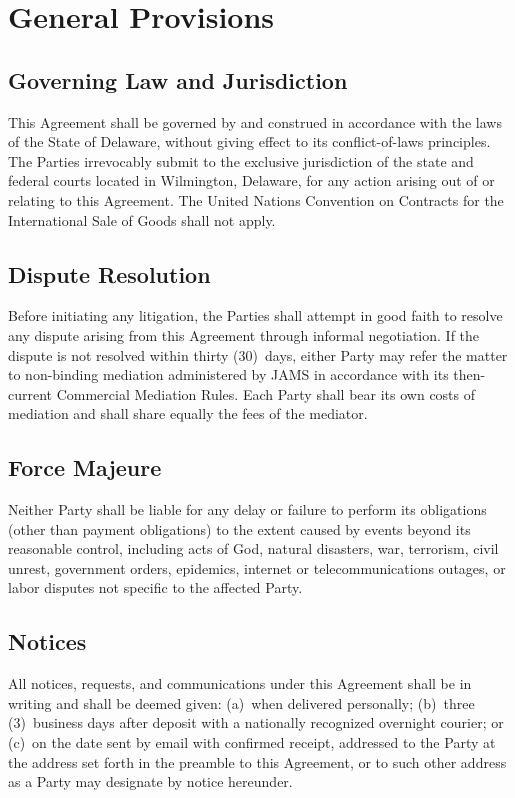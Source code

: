 \section{General Provisions}

\subsection{Governing Law and Jurisdiction}
This Agreement shall be governed by and construed in accordance with the laws of the State of Delaware, without giving effect to its conflict-of-laws principles. The Parties irrevocably submit to the exclusive jurisdiction of the state and federal courts located in Wilmington, Delaware, for any action arising out of or relating to this Agreement. The United Nations Convention on Contracts for the International Sale of Goods shall not apply.

\subsection{Dispute Resolution}
Before initiating any litigation, the Parties shall attempt in good faith to resolve any dispute arising from this Agreement through informal negotiation. If the dispute is not resolved within thirty (30)~days, either Party may refer the matter to non-binding mediation administered by JAMS in accordance with its then-current Commercial Mediation Rules. Each Party shall bear its own costs of mediation and shall share equally the fees of the mediator.

\subsection{Force Majeure}
Neither Party shall be liable for any delay or failure to perform its obligations (other than payment obligations) to the extent caused by events beyond its reasonable control, including acts of God, natural disasters, war, terrorism, civil unrest, government orders, epidemics, internet or telecommunications outages, or labor disputes not specific to the affected Party.

\subsection{Notices}
All notices, requests, and communications under this Agreement shall be in writing and shall be deemed given: (a)~when delivered personally; (b)~three (3)~business days after deposit with a nationally recognized overnight courier; or (c)~on the date sent by email with confirmed receipt, addressed to the Party at the address set forth in the preamble to this Agreement, or to such other address as a Party may designate by notice hereunder.


